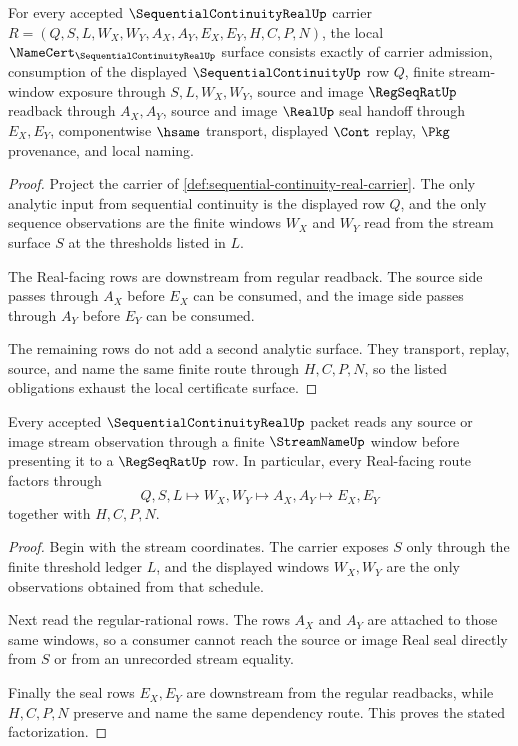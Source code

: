\begin{theorem}
\label{thm:sequential-continuity-real-namecert-obligations}
For every accepted $\SequentialContinuityRealUp$ carrier $R=(Q,S,L,W_X,W_Y,A_X,A_Y,E_X,E_Y,H,C,P,N)$, the local $\NameCert_{\SequentialContinuityRealUp}$ surface consists exactly of carrier admission, consumption of the displayed $\SequentialContinuityUp$ row $Q$, finite stream-window exposure through $S,L,W_X,W_Y$, source and image $\RegSeqRatUp$ readback through $A_X,A_Y$, source and image $\RealUp$ seal handoff through $E_X,E_Y$, componentwise $\hsame$ transport, displayed $\Cont$ replay, $\Pkg$ provenance, and local naming.
\end{theorem}
\begin{proof}
Project the carrier of \autoref{def:sequential-continuity-real-carrier}. The only analytic input from sequential continuity is the displayed row $Q$, and the only sequence observations are the finite windows $W_X$ and $W_Y$ read from the stream surface $S$ at the thresholds listed in $L$.

The Real-facing rows are downstream from regular readback. The source side passes through $A_X$ before $E_X$ can be consumed, and the image side passes through $A_Y$ before $E_Y$ can be consumed.

The remaining rows do not add a second analytic surface. They transport, replay, source, and name the same finite route through $H,C,P,N$, so the listed obligations exhaust the local certificate surface.
\end{proof}

\begin{theorem}
\label{thm:sequential-continuity-real-stream-readback}
Every accepted $\SequentialContinuityRealUp$ packet reads any source or image stream observation through a finite $\StreamNameUp$ window before presenting it to a $\RegSeqRatUp$ row. In particular, every Real-facing route factors through
$$
Q,S,L
\longmapsto
W_X,W_Y
\longmapsto
A_X,A_Y
\longmapsto
E_X,E_Y
$$
together with $H,C,P,N$.
\end{theorem}
\begin{proof}
Begin with the stream coordinates. The carrier exposes $S$ only through the finite threshold ledger $L$, and the displayed windows $W_X,W_Y$ are the only observations obtained from that schedule.

Next read the regular-rational rows. The rows $A_X$ and $A_Y$ are attached to those same windows, so a consumer cannot reach the source or image Real seal directly from $S$ or from an unrecorded stream equality.

Finally the seal rows $E_X,E_Y$ are downstream from the regular readbacks, while $H,C,P,N$ preserve and name the same dependency route. This proves the stated factorization.
\end{proof}

